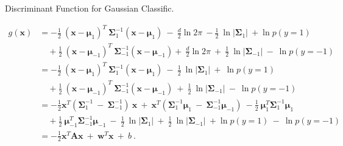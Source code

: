 \documentclass[xcolor=pdftex,dvipsnames,table]{beamer}
\begin{document}
\begin{frame}{Discriminant Function for Gaussian Classific.}
	\par
	\scriptsize
	\begin{equation*}
		\begin{split}
			g(\mathbf{x}) & =
			- \frac{1}{2} \ (\mathbf{x}-\mathbf{\mu}_1)^T \ \mathbf{\Sigma}_{1}^{-1} (\mathbf{x}-\mathbf{\mu}_1)
			\ - \ \frac{d}{2} \ln 2 \pi \ - \frac{1}{2} \ \ln
			\left| \mathbf{\Sigma}_1 \right| \ + \ln p(y=1) \\ 
			& \quad  + \frac{1}{2}
			\ (\mathbf{x}-\mathbf{\mu}_{-1})^T \ \mathbf{\Sigma}_{-1}^{-1} (\mathbf{x} -\mathbf{\mu}_{-1}) + \
			\frac{d}{2} \ln 2 \pi \ + \  \frac{1}{2} \ \ln \left| \mathbf{\Sigma}_{-1}
			\right| \ - \ \ln p(y=-1) \\ 
			& = - \frac{1}{2} \
			(\mathbf{x}-\mathbf{\mu}_1)^T \ \mathbf{\Sigma}_{1}^{-1} (\mathbf{x}-\mathbf{\mu}_1) \ - \  \frac{1}{2} \ \ln
			\left| \mathbf{\Sigma}_1 \right| \ + \ \ln p(y=1) \\ & 
			\quad + \frac{1}{2}
			\ (\mathbf{x}-\mathbf{\mu}_{-1})^T \ \mathbf{\Sigma}_{-1}^{-1} (\mathbf{x}-\mathbf{\mu}_{-1}) \ + \
			\frac{1}{2} \ \ln \left| \mathbf{\Sigma}_{-1} \right| \ - \ \ln p(y=-1) \\  
			& =  - \frac{1}{2} \mathbf{x}^T \left( \mathbf{\Sigma}_{1}^{-1} \ - \
			\mathbf{\Sigma}_{-1}^{-1} \right) \ \mathbf{x} \ + \  \mathbf{x}^T \left( \mathbf{\Sigma}_{1}^{-1}
			\mathbf{\mu}_1   \ - \ \mathbf{\Sigma}_{-1}^{-1} \mathbf{\mu}_{-1}\right) \ -
			\frac{1}{2} \ \mathbf{\mu}_1^T \mathbf{\Sigma}_{1}^{-1} \mathbf{\mu}_1 \\
			& \quad + \frac{1}{2} \ \mathbf{\mu}_{-1}^T  \mathbf{\Sigma}_{-1}^{-1} \mathbf{\mu}_{-1}
			\ - \  \frac{1}{2} \ \ln \left| \mathbf{\Sigma}_1 \right| \ + \  \frac{1}{2} \
			\ln \left| \mathbf{\Sigma}_{-1} \right| \ +\ln p(y=1) \  - \ \ln
			p(y=-1) \\
			& =  - \frac{1}{2} \mathbf{x}^T \mathbf{A} \mathbf{x} \ + \  \mathbf{w}^T
			\mathbf{x} \ + \ b \ .
		\end{split}
	\end{equation*}
\end{frame}
\end{document}
